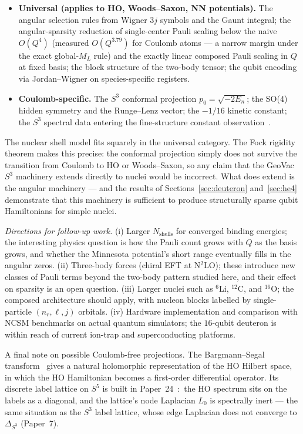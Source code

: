 \documentclass[twocolumn,prc,amsmath,amssymb,superscriptaddress]{revtex4-2}
\begin{document}
\begin{itemize}
  \item \textbf{Universal (applies to HO, Woods--Saxon, NN potentials).}
    The angular selection rules from Wigner $3j$ symbols and the Gaunt
    integral; the angular-sparsity reduction of single-center Pauli
    scaling below the naive $O(Q^4)$ (measured $O(Q^{3.79})$ for
    Coulomb atoms --- a narrow margin under the exact global-$M_L$
    rule) and the exactly linear composed Pauli scaling in $Q$ at
    fixed basis; the
    block structure of the two-body tensor; the
    qubit encoding via Jordan--Wigner on species-specific registers.
  \item \textbf{Coulomb-specific.} The $S^3$ conformal projection
    $p_0 = \sqrt{-2E_n}$; the SO(4) hidden symmetry and the Runge--Lenz
    vector; the $-1/16$ kinetic constant; the $S^3$ spectral data entering the
    fine-structure constant observation~\cite{Paper2}.
\end{itemize}

The nuclear shell model fits squarely in the universal category. The
Fock rigidity theorem makes this precise: the conformal projection
simply does not survive the transition from Coulomb to HO or
Woods--Saxon, so any claim that the GeoVac $S^3$ machinery extends
directly to nuclei would be incorrect. What does extend is the
angular machinery --- and the results of Sections~\ref{sec:deuteron}
and~\ref{sec:he4} demonstrate that this machinery is sufficient to
produce structurally sparse qubit Hamiltonians for simple nuclei.

\emph{Directions for follow-up work.} (i) Larger
$N_{\mathrm{shells}}$ for converged binding energies; the interesting
physics question is how the Pauli count grows with $Q$ as
the basis grows, and whether the Minnesota potential's short range
eventually fills in the angular zeros. (ii) Three-body forces (chiral
EFT at N$^2$LO); these introduce new classes of Pauli terms beyond
the two-body pattern studied here, and their effect on sparsity is an
open question. (iii) Larger nuclei such as $^6$Li, $^{12}$C, and
$^{16}$O; the composed architecture should apply, with nucleon
blocks labelled by single-particle $(n_r, \ell, j)$ orbitals. (iv)
Hardware implementation and comparison with NCSM benchmarks on
actual quantum simulators; the $16$-qubit deuteron is within reach
of current ion-trap and superconducting platforms.

A final note on possible Coulomb-free projections. The Bargmann--Segal
transform~\cite{Bargmann1961} gives a natural holomorphic
representation of the HO Hilbert space, in which the HO Hamiltonian
becomes a first-order differential operator.  Its discrete label
lattice on $S^5$ is built in Paper~24~\cite{Paper24}:\ the HO spectrum
sits on the labels as a diagonal, and the lattice's node Laplacian
$L_0$ is spectrally inert --- the same situation as the $S^3$ label
lattice, whose edge Laplacian does not converge to $\Delta_{S^3}$
(Paper~7).
\end{document}
